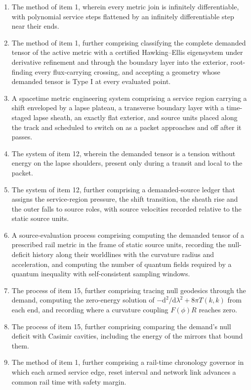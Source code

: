\documentclass[11pt]{article}
\newcommand{\dd}{\mathrm{d}}
\begin{document}
\begin{enumerate}
\item The method of item 1, wherein every metric join is infinitely differentiable, with polynomial service steps flattened by an infinitely differentiable step near their ends.

\item The method of item 1, further comprising classifying the complete demanded tensor of the active metric with a certified Hawking--Ellis eigensystem under derivative refinement and through the boundary layer into the exterior, root-finding every flux-carrying crossing, and accepting a geometry whose demanded tensor is Type I at every evaluated point.

\item A spacetime metric engineering system comprising a service region carrying a shift enveloped by a lapse plateau, a transverse boundary layer with a time-staged lapse sheath, an exactly flat exterior, and source units placed along the track and scheduled to switch on as a packet approaches and off after it passes.

\item The system of item 12, wherein the demanded tensor is a tension without energy on the lapse shoulders, present only during a transit and local to the packet.

\item The system of item 12, further comprising a demanded-source ledger that assigns the service-region pressure, the shift transition, the sheath rise and the outer falls to source roles, with source velocities recorded relative to the static source units.

\item A source-evaluation process comprising computing the demanded tensor of a prescribed rail metric in the frame of static source units, recording the null-deficit history along their worldlines with the curvature radius and acceleration, and computing the number of quantum fields required by a quantum inequality with self-consistent sampling windows.

\item The process of item 15, further comprising tracing null geodesics through the demand, computing the zero-energy solution of $-\dd^2/\dd\lambda^2+8\pi T(k,k)$ from each end, and recording where a curvature coupling $F(\phi)R$ reaches zero.

\item The process of item 15, further comprising comparing the demand's null deficit with Casimir cavities, including the energy of the mirrors that bound them.

\item The method of item 1, further comprising a rail-time chronology governor in which each armed service edge, reset interval and network link advances a common rail time with safety margin.
\end{enumerate}
\end{document}
